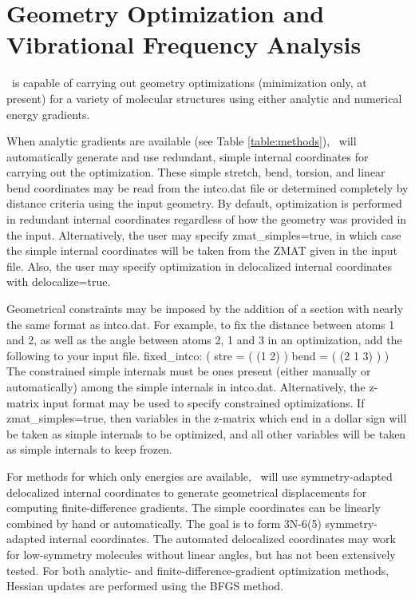 \section{Geometry Optimization and Vibrational Frequency Analysis} \label{opt}

\PSIthree\ is capable of carrying out geometry optimizations (minimization
only, at present) for a variety of molecular structures using either analytic
and numerical energy gradients.  

When analytic gradients are available (see Table \ref{table:methods}),
\PSIthree\ will automatically generate and use redundant, simple internal
coordinates for carrying out the optimization.  These simple stretch, bend,
torsion, and linear bend coordinates may be read from the intco.dat file
or determined completely by distance criteria using the input geometry.
By default, optimization is performed in redundant internal coordinates
regardless of how the geometry was provided in the input.  Alternatively,
the user may specify zmat_simples=true, in which case the simple internal
coordinates will be taken from the ZMAT given in the input file.  Also,
the user may specify optimization in delocalized internal coordinates
with delocalize=true.  

Geometrical constraints may be imposed by the addition of a section
with nearly the same format as intco.dat.  For example, to fix the distance
between atoms 1 and 2, as well as the angle between atoms 2, 1 and 3
in an optimization, add the following to your input file.
fixed_intco: (
  stre = (
    (1 2)
  )
  bend = (
    (2 1 3)
  )
)
The constrained simple internals must be ones present (either manually or
automatically) among the simple internals in intco.dat.  Alternatively,
the z-matrix input format may be used to specify constrained optimizations.
If zmat_simples=true, then variables in the z-matrix which end in
a dollar sign will be taken as simple internals to be optimized, and
all other variables will be taken as simple internals to keep frozen.

For methods for which only energies are available, \PSIthree\ will use
symmetry-adapted delocalized internal coordinates to generate geometrical
displacements for computing finite-difference gradients. The simple
coordinates can be linearly combined by hand or automatically.  The goal
is to form 3N-6(5) symmetry-adapted internal coordinates.  The automated
delocalized coordinates may work for low-symmetry molecules without
linear angles, but has not been extensively tested.  For both analytic-
and finite-difference-gradient optimization methods, Hessian updates are
performed using the BFGS method.

